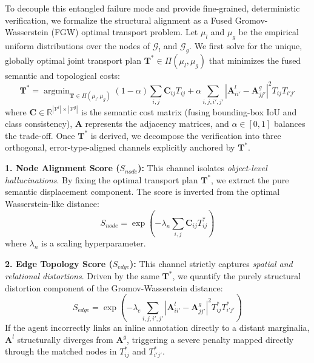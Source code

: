 \documentclass{article}
\begin{document}
To decouple this entangled failure mode and provide fine-grained, deterministic verification, we formalize the structural alignment as a Fused Gromov-Wasserstein (FGW) optimal transport problem. Let $\mu_l$ and $\mu_g$ be the empirical uniform distributions over the nodes of $\mathcal{G}_l$ and $\mathcal{G}_g$. We first solve for the unique, globally optimal joint transport plan $\mathbf{T}^* \in \Pi(\mu_l, \mu_g)$ that minimizes the fused semantic and topological costs:
\begin{equation}
    \mathbf{T}^* = \mathop{\arg\min}_{\mathbf{T} \in \Pi(\mu_l, \mu_g)} (1-\alpha)\sum_{i,j} \mathbf{C}_{ij} T_{ij} + \alpha \sum_{i,j,i',j'} \left| \mathbf{A}^l_{ii'} - \mathbf{A}^g_{jj'} \right|^2 T_{ij} T_{i'j'}
\end{equation}
where $\mathbf{C} \in \mathbb{R}^{|\mathcal{V}^l| \times |\mathcal{V}^g|}$ is the semantic cost matrix (fusing bounding-box IoU and class consistency), $\mathbf{A}$ represents the adjacency matrices, and $\alpha \in [0,1]$ balances the trade-off. Once $\mathbf{T}^*$ is derived, we decompose the verification into three orthogonal, error-type-aligned channels explicitly anchored by $\mathbf{T}^*$.

\textbf{1. Node Alignment Score ($S_{node}$):} 
This channel isolates \textit{object-level hallucinations}. By fixing the optimal transport plan $\mathbf{T}^*$, we extract the pure semantic displacement component. The score is inverted from the optimal Wasserstein-like distance:
\begin{equation}
    S_{node} = \exp\left( - \lambda_n \sum_{i,j} \mathbf{C}_{ij} T^*_{ij} \right)
\end{equation}
where $\lambda_n$ is a scaling hyperparameter.

\textbf{2. Edge Topology Score ($S_{edge}$):} 
This channel strictly captures \textit{spatial and relational distortions}. Driven by the same $\mathbf{T}^*$, we quantify the purely structural distortion component of the Gromov-Wasserstein distance:
\begin{equation}
    S_{edge} = \exp\left( - \lambda_e \sum_{i,j,i',j'} \left| \mathbf{A}^l_{ii'} - \mathbf{A}^g_{jj'} \right|^2 T^*_{ij} T^*_{i'j'} \right)
\end{equation}
If the agent incorrectly links an inline annotation directly to a distant marginalia, $\mathbf{A}^l$ structurally diverges from $\mathbf{A}^g$, triggering a severe penalty mapped directly through the matched nodes in $T^*_{ij}$ and $T^*_{i'j'}$.
\end{document}
